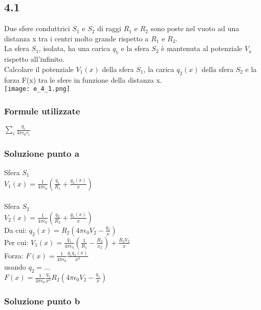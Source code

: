 \documentclass[../../main.tex]{subfiles}
\begin{document}
\subsection*{4.1}
Due sfere conduttrici $S_1$ e $S_2$ di raggi $R_1$ e $R_2$ sono poste nel vuoto ad una distanza x tra i centri molto grande rispetto a $R_1$ e $R_2$.
\\La sfera $S_1$, isolata, ha una carica $q_1$ e la sfera $S_2$ è mantenuta al potenziale $V_a$ rispetto all'infinito.
\\Calcolare il potenziale $V_1(x)$ della sfera $S_1$, la carica $q_2(x)$ della sfera $S_2$ e la forza F(x) tra le sfere in funzione della distanza x.
\\\texttt{[image: e\_4\_1.png]}
\subsubsection*{Formule utilizzate}
$\sum_i\frac{q_i}{4\pi\epsilon_0r_i}$
\subsubsection*{Soluzione punto a}
Sfera $S_1$
\\$V_1(x) = \frac{1}{4\pi\epsilon_0}\left(\frac{q_1}{R_1}+\frac{q_2(x)}{x}\right)$
\\\\Sfera $S_2$
\\$V_2(x) = \frac{1}{4\pi\epsilon_0}\left(\frac{q_2}{R_2}+\frac{q_1(x)}{x}\right)$
\\Da cui: $q_2(x) = R_2(4\pi\epsilon_0V_2 - \frac{q_1}{x})$
\\Per cui: $V_1(x) = \frac{q_1}{4\pi\epsilon_0}\left(\frac{1}{R_1}-\frac{R_2}{x_2}\right) + \frac{R_2V_2}{x}$
\\Forza: $F(x) = \frac{1}{4\pi\epsilon_0}\frac{q_1q_2(x)}{x^2}$
\\usando $q_2 = ...$
\\$F(x) = \frac{1}{4\pi\epsilon_0}\frac{q_1}{x^2}R_2\left(4\pi\epsilon_0V_2-\frac{q_1}{x}\right)$
\subsubsection*{Soluzione punto b}
\newpage
\end{document}
